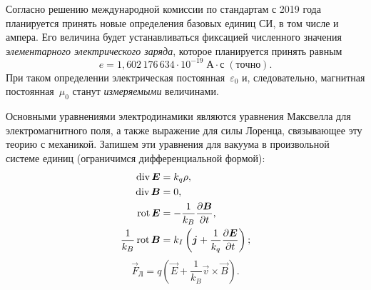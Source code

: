 \begin{lab:note}
Согласно решению международной комиссии по стандартам с 2019 года
планируется принять новые определения базовых единиц СИ, в том числе и ампера.
Его величина будет устанавливаться фиксацией численного значения
\emph{элементарного электрического заряда}, которое
планируется принять равным
\[
e = 1,602\,176\,634\cdot 10^{-19}\;\text{А}\cdot\text{с}\;(точно).
\]
При таком определении электрическая постоянная~$\varepsilon_0$ и, следовательно,
магнитная постоянная~$\mu_0$ станут \emph{измеряемыми} величинами.
\end{lab:note}


Основными уравнениями электродинамики являются уравнения Максвелла
для электромагнитного поля, а также выражение для силы Лоренца, связывающее
эту теорию с механикой. Запишем эти уравнения для вакуума в произвольной
системе единиц (ограничимся дифференциальной формой):
\begin{align}
\mathop{\mathrm{div}} {\boldsymbol{E}} & =k_{q}\rho,\label{eq:gauss}\\
\mathop{\mathrm{div}} {\boldsymbol{B}} & =0,\\
\mathop{\mathrm{rot}} {\boldsymbol{E}} & =-\frac{1}{k_{B}}\frac{\partial{\boldsymbol{B}}}{\partial t},\label{eq:faradey}\\
\frac{1}{k_B}\mathop{\mathrm{rot}} {\boldsymbol{B}} & =k_{I}\left({\boldsymbol{j}}+\frac{1}{k_{q}}\frac{\partial{\boldsymbol{E}}}{\partial t}\right);\label{eq:ampere-dif}
\end{align}
\begin{equation}
\vec{F}_Л=q\left(\vec{E}+\frac{1}{k_{B}}\vec{v}\times\vec{B}\right).\label{eq:lorentz}
\end{equation}

